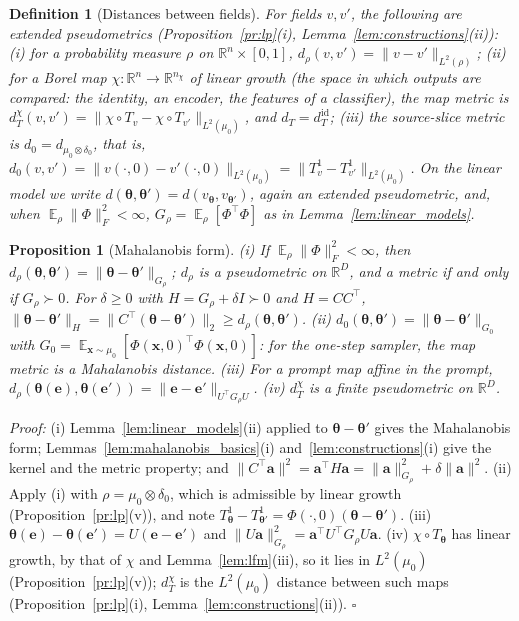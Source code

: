 \documentclass{article}
\DeclareMathOperator{\E}{\mathbb{E}}
\newcommand{\RR}{\mathbb{R}}
\newcommand{\bth}{\boldsymbol{\theta}}
\newcommand{\bx}{\mathbf{x}}
\newcommand{\ba}{\mathbf{a}}
\newcommand{\be}{\mathbf{e}}
\theoremstyle{plain}
\newtheorem{proposition}[theorem]{Proposition}
\newtheorem{definition}[theorem]{Definition}
\theoremstyle{remark}
\begin{document}
\begin{definition}[Distances between fields]\label{def:metrics}
For fields $v,v'$, the following are extended pseudometrics (Proposition~\ref{pr:lp}(i), Lemma~\ref{lem:constructions}(ii)):
(i) for a probability measure $\rho$ on $\RR^n\times[0,1]$, $d_\rho(v,v')=\|v-v'\|_{L^2(\rho)}$;
(ii) for a Borel map $\chi:\RR^n\to\RR^{n_\chi}$ of linear growth (the space in which outputs are
compared: the identity, an encoder, the features of a classifier), the \emph{map metric} is
$d^\chi_T(v,v')=\|\chi\circ T_v-\chi\circ T_{v'}\|_{L^2(\mu_0)}$, and $d_T=d^{\mathrm{id}}_T$;
(iii) the \emph{source-slice metric} is $d_0=d_{\mu_0\otimes\delta_0}$, that is,
$d_0(v,v')=\|v(\cdot,0)-v'(\cdot,0)\|_{L^2(\mu_0)}=\|T^1_v-T^1_{v'}\|_{L^2(\mu_0)}$.
On the linear model we write $d(\bth,\bth')=d(v_{\bth},v_{\bth'})$, again an extended pseudometric, and, when $\E_\rho\|\Phi\|_F^2<\infty$,
$G_\rho=\E_\rho[\Phi^\top\Phi]$ as in Lemma~\ref{lem:linear_models}.
\end{definition}

\begin{proposition}[Mahalanobis form]\label{pr:mahalanobis}
(i) If $\E_\rho\|\Phi\|_F^2<\infty$, then $d_\rho(\bth,\bth')=\|\bth-\bth'\|_{G_\rho}$; $d_\rho$ is a pseudometric
on $\RR^D$, and a metric if and only if $G_\rho\succ0$. For $\delta\ge0$ with $H=G_\rho+\delta I\succ0$
and $H=CC^\top$, $\|\bth-\bth'\|_H=\|C^\top(\bth-\bth')\|_2\ge d_\rho(\bth,\bth')$.
(ii) $d_0(\bth,\bth')=\|\bth-\bth'\|_{G_0}$ with $G_0=\E_{\bx\sim\mu_0}[\Phi(\bx,0)^\top\Phi(\bx,0)]$: for the one-step
sampler, the map metric is a Mahalanobis distance.
(iii) For a prompt map affine in the prompt, $d_\rho(\bth(\be),\bth(\be'))=\|\be-\be'\|_{U^\top G_\rho U}$.
(iv) $d^\chi_T$ is a finite pseudometric on $\RR^D$.
\end{proposition}
\textit{Proof:}
(i) Lemma~\ref{lem:linear_models}(ii) applied to $\bth-\bth'$ gives the Mahalanobis form; Lemmas~\ref{lem:mahalanobis_basics}(i)
and~\ref{lem:constructions}(i) give the kernel and the metric property; and $\|C^\top\ba\|^2=\ba^\top H\ba=\|\ba\|_{G_\rho}^2+\delta\|\ba\|^2$.
(ii) Apply (i) with $\rho=\mu_0\otimes\delta_0$, which is admissible by linear growth (Proposition~\ref{pr:lp}(v)), and note
$T^1_{\bth}-T^1_{\bth'}=\Phi(\cdot,0)(\bth-\bth')$.
(iii) $\bth(\be)-\bth(\be')=U(\be-\be')$ and $\|U\ba\|^2_{G_\rho}=\ba^\top U^\top G_\rho U\ba$.
(iv) $\chi\circ T_{\bth}$ has linear growth, by that of $\chi$ and Lemma~\ref{lem:lfm}(iii), so it lies in $L^2(\mu_0)$
(Proposition~\ref{pr:lp}(v)); $d^\chi_T$ is the $L^2(\mu_0)$ distance between such maps (Proposition~\ref{pr:lp}(i),
Lemma~\ref{lem:constructions}(ii)). \hfill$\square$
\end{document}
